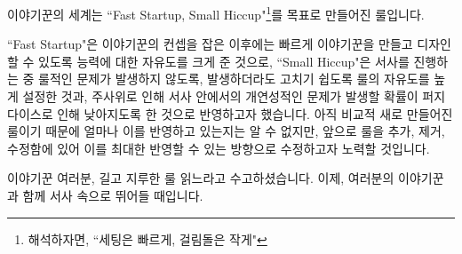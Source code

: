 \documentclass{report}
\begin{document}
	
	이야기꾼의 세계는 ``Fast Startup, Small Hiccup"\footnote{해석하자면, ``세팅은 빠르게, 걸림돌은 작게"}를 목표로 만들어진 룰입니다.
	
	``Fast Startup"은 이야기꾼의 컨셉을 잡은 이후에는 빠르게 이야기꾼을 만들고 디자인할 수 있도록 능력에 대한 자유도를 크게 준 것으로, ``Small Hiccup"은 서사를 진행하는 중 룰적인 문제가 발생하지 않도록, 발생하더라도 고치기 쉽도록 룰의 자유도를 높게 설정한 것과, 주사위로 인해 서사 안에서의 개연성적인 문제가 발생할 확률이 퍼지 다이스로 인해 낮아지도록 한 것으로 반영하고자 했습니다. 아직 비교적 새로 만들어진 룰이기 때문에 얼마나 이를 반영하고 있는지는 알 수 없지만, 앞으로 룰을 추가, 제거, 수정함에 있어 이를 최대한 반영할 수 있는 방향으로 수정하고자 노력할 것입니다.
	
	이야기꾼 여러분, 길고 지루한 룰 읽느라고 수고하셨습니다. 이제, 여러분의 이야기꾼과 함께 서사 속으로 뛰어들 때입니다.
	
\end{document}
